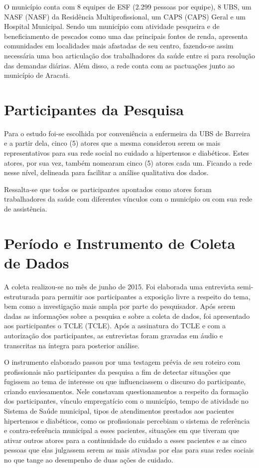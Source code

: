 O município conta com 8 equipes de \acrshort{ESF} (2.299 pessoas por equipe), 8 \acrshort{UBS}, um \acrlong{NASF} (\acrshort{NASF}) da Residência Multiprofissional, um \acrlong{CAPS} (\acrshort{CAPS}) Geral e um Hospital Municipal. Sendo um município com atividade pesqueira e de beneficiamento de pescados como uma das principais fontes de renda, apresenta comunidades em localidades mais afastadas de seu centro, fazendo-se assim necessária uma boa articulação dos trabalhadores da saúde entre si para resolução das demandas diárias. Além disso, a rede conta com as pactuações junto ao município de Aracati.  

\section{Participantes da Pesquisa}
Para o estudo foi-se escolhida por conveniência a enfermeira da \acrlong{UBS} de Barreira e a partir dela, cinco (5) atores que a mesma considerou serem os mais representativos para sua rede social no cuidado a hipertensos e diabéticos. Estes atores, por sua vez, também nomearam cinco (5) atores cada um. Ficando a rede nesse nível, delineada para facilitar a análise qualitativa dos dados. 

Ressalta-se que todos os participantes apontados como atores foram trabalhadores da saúde com diferentes vínculos com o município ou com sua rede de assistência. 

\section{Período e Instrumento de Coleta de Dados}
A coleta realizou-se no mês de junho de 2015. Foi elaborada uma entrevista semi-estruturada para permitir aos participantes a exposição livre a respeito do tema, bem como a investigação mais ampla por parte do pesquisador. Após serem dadas as informações sobre a pesquisa e sobre a coleta de dados, foi apresentado aos participantes o \acrlong{TCLE} (\acrshort{TCLE}). Após a assinatura do \acrshort{TCLE}  e com a autorização dos participantes, as entrevistas foram gravadas em áudio e transcritas na íntegra para posterior análise. 

O instrumento elaborado passou por uma testagem prévia de seu roteiro com profissionais não participantes da pesquisa a fim de detectar situações que fugissem ao tema de interesse ou que influenciassem o discurso do participante, criando enviesamentos. Nele constavam questionamentos a respeito da formação dos participantes, vínculo empregatício com o município, tempo de atividade no Sistema de Saúde municipal, tipos de atendimentos prestados aos pacientes hipertensos e diabéticos, como os profissionais percebiam o sistema de referência e contra-referência municipal a esses pacientes, situações em que tiveram que ativar outros atores para a continuidade do cuidado a esses pacientes e as cinco pessoas que elas julgassem serem as mais ativadas por elas para suas redes sociais no que tange ao desempenho de duas ações de cuidado.  

